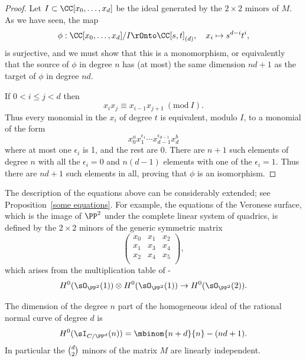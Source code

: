 \begin{proof}
Let $I\subset \CC[x_0,\dots, x_d]$ be the ideal generated by the $2\times 2$ minors of $M$.
As we have seen, the map
$$
\phi: \CC[x_0, \dots, x_d]/I \rOnto \CC[s,t]_{(d)},\quad x_i\mapsto s^{d-i}t^i,
$$
is surjective, and we must show that this is a monomorphism, or equivalently that the source of $\phi$ in degree $n$ has
(at most) the same dimension $nd+1$ as the target of $\phi$ in degree $nd$.

If $0<i\leq j<d$ then 
$$
x_ix_j \equiv x_{i-1}x_{j+1}  \ (\mathrm{ mod}\ I).
$$
Thus every monomial in the $x_i$ of degree $t$ is equivalent, modulo $I$, to a monomial of the form
 $$
 x_0^ax_1^{\epsilon_1}\cdots x_{d-1}^{\epsilon_{d-1}}x_d^b
 $$
 where at most one $\epsilon_i$ is 1, and the rest are 0. There are $n+1$ such elements of degree $n$ with all the $\epsilon_i = 0$
 and $n(d-1)$ elements with one of the $\epsilon_i = 1$. Thus there are $nd+1$ such elements in all, proving that $\phi$ is
 an isomorphism.
  \end{proof}

\begin{fact}\label{Veronese equations fact}
The description of the equations above can be considerably extended;
see Proposition~\ref{some equations}. For example, the equations of the 
%
Veronese surface, which is the image of $\PP^{2}$
 under the complete linear system of quadrics, is defined by the $2\times 2$ minors of the generic
 symmetric matrix 
 $$
 \begin{pmatrix}
 x_{0}&x_{1}&x_{2}\\
  x_{1}&x_{3}&x_{4}\\
   x_{2}&x_{4}&x_{5}\\
\end{pmatrix}
,
$$
which arises from the multiplication table of 
\belowdisplayskip-\baselineskip
$$
H^{0}(\sO_{\PP^{2}}(1)) \otimes H^{0}(\sO_{\PP^{2}}(1)) \to H^{0}(\sO_{\PP^{2}}(2)).
$$
\end{fact}

\vspace*{3pt}

\begin{corollary}\label{forms vanishing on the RNC}
The dimension of the degree $n$ part of the homogeneous ideal of the 
rational normal curve
%
of degree $d$ is
$$
H^0(\sI_{C/\PP^d}(n)) = \mbinom{n+d}{n} - (nd+1).
$$
In particular 
the $\tbinom{d}{ 2}$ minors of the matrix $M$ are linearly independent.
\end{corollary}

